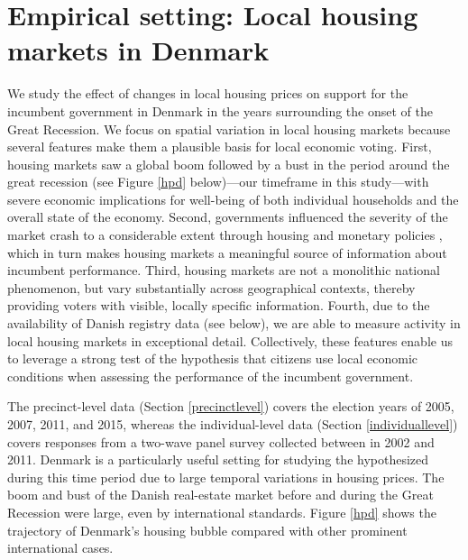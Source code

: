 \documentclass[12pt,a4paper]{article}
\begin{document}
	\section{Empirical setting: Local housing markets in Denmark}
	We study the effect of changes in local housing prices on support for the incumbent government in Denmark in the years surrounding the onset of the Great Recession. We focus on spatial variation in local housing markets because several features make them a plausible basis for local economic voting. First, housing markets saw a global boom followed by a bust in the period around the great recession (see Figure \ref{hpd} below)—our timeframe in this study—with severe economic implications for well-being of both individual households and the overall state of the economy. Second, governments influenced the severity of the market crash to a considerable extent through housing and monetary policies \citep{dam2011housing}, which in turn makes housing markets a meaningful source of information about incumbent performance. Third, housing markets are not a monolithic national phenomenon, but vary substantially across geographical contexts, thereby providing voters with visible, locally specific information. Fourth, due to the availability of Danish registry data (see below), we are able to measure activity in local housing markets in exceptional detail. Collectively, these features enable us to leverage a strong test of the hypothesis that citizens use local economic conditions when assessing the performance of the incumbent government.
	
	The precinct-level data (Section \ref{precinctlevel}) covers the election years of 2005, 2007, 2011, and 2015, whereas the individual-level data (Section \ref{individuallevel}) covers responses from a two-wave panel survey collected between in 2002 and 2011. Denmark is a particularly useful setting for studying the hypothesized during this time period due to large temporal variations in housing prices. The boom and bust of the Danish real-estate market before and during the Great Recession were large, even by international standards. Figure \ref{hpd} shows the trajectory of Denmark's housing bubble compared with other prominent international cases.
	
\end{document}
